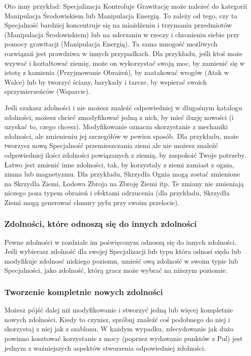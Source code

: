 Oto inny przykład: Specjalizacja Kontroluje Grawitację może należeć do kategorii Manipulacja Środowiskiem lub Manipulacja Energią. To zależy od tego, czy ta Specjalność bardziej koncentruje się na miażdżeniu i trzymaniu przedmiotów (Manipulacja Środowiskiem) lub na uderzaniu w rzeczy i chronieniu siebie przy pomocy grawitacji (Manipulacja Energią).
Ta sama mnogość możliwych rozwiązań jest prawdziwa w innych przypadkach. Dla przykładu, jeśli ktoś może wzywać i kształtować ziemię, może on wykorzystać swoją moc, by zamienić się w istotę z kamienia (Przyjmowanie Obrażeń), by zaatakować wrogów (Atak w Walce) lub by tworzyć ściany, barykady i tarcze, by wspierać swoich sprzymierzeńców (Wsparcie).

Jeśli szukasz zdolności i nie możesz znaleźć odpowiedniej w długaśnym katalogu zdolności, możesz chcieć zmodyfikować jedną z nich, by mieć iluzję nowości (i uzyskać to, czego chcesz). Modyfikowanie oznacza skorzystanie z mechaniki zdolności, ale zmienieniu jej szczegółów w pewien sposób. Dla przykładu, może tworzysz nową Specjalność przemieszczania ziemi ale nie możesz znaleźć odpowiedniej ilości zdolności powiązanych z ziemią, by zaspokoić Twoje potrzeby. Łatwo jest zmienić inne zdolności, tak, by korzystały z ziemi zamiast z ognia, zimna lub magnetyzmu. Dla przykładu, Skrzydła Ognia mogą zostać zmienione na Skrzydła Ziemi, Lodowa Zbroja na Zbroję Ziemi itp. Te zmiany nie zmieniają niczego poza typem obrażeń i efektami odrzucenia (dla przykładu, Skrzydła Ziemi mogą generować chmury pyłu przy swoim przelocie).

\subsubsection{Zdolności, które odnoszą się do innych zdolności}

Pewne zdolności w rozdziale im poświęconym odnoszą się do innych zdolności. Jeśli wybierasz zdolność dla swojej Specjalizacji lub typu która odnosi siędo lub modyfikuje zdolnosć niskiego poziomu, umieść ową zdolność w swoim typie lub Specjalności, jako zdolność, którą gracz może wybrać na niższym poziomie.

\subsubsection{Tworzenie kompletnie nowych zdolności}

Możesz pójść dalej niż modyfikowanie i stworzyć jedną lub więcej kompletnie nowych zdolności. Kiedy to czynisz, spróbuj znaleźć coś podobnego do niej i skorzystaj z niej jak z szablonu. W każdym wypadku, zdecydowanie jak dużo powinno kosztować korzystanie z mocy (poprzez wydawanie punktów z Pul) jest jednym z ważniejszych aspektów stworzenia odpowiedniej zdolności.

